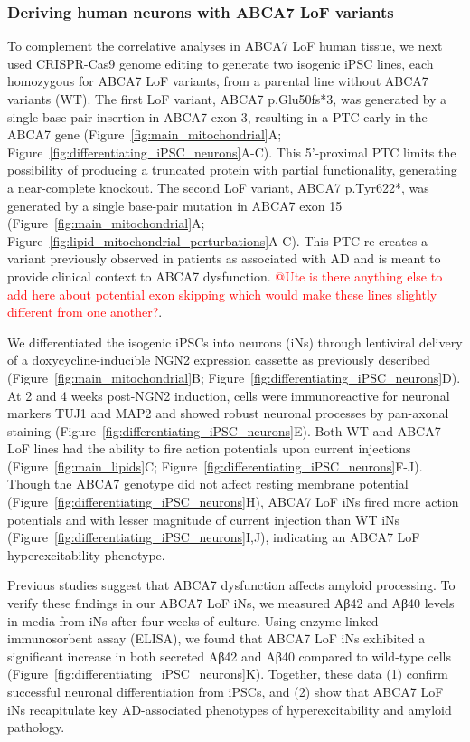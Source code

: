 \subsubsection{Deriving human neurons with ABCA7 LoF variants}
To complement the correlative analyses in ABCA7 LoF human tissue, we next used CRISPR-Cas9 genome editing to generate two isogenic iPSC lines, each homozygous for ABCA7 LoF variants, from a parental line without ABCA7 variants (WT). The first LoF variant, ABCA7 p.Glu50fs*3, was generated by a single base-pair insertion in ABCA7 exon 3, resulting in a PTC early in the ABCA7 gene (Figure~\ref{fig:main_mitochondrial}A; Figure~\ref{fig:differentiating_iPSC_neurons}A-C). This 5'-proximal PTC limits the possibility of producing a truncated protein with partial functionality, generating a near-complete knockout. The second LoF variant, ABCA7 p.Tyr622*, was generated by a single base-pair mutation in ABCA7 exon 15 (Figure~\ref{fig:main_mitochondrial}A; Figure~\ref{fig:lipid_mitochondrial_perturbations}A-C). This PTC re-creates a variant previously observed in patients as associated with AD \cite{Steinberg2015-mu} and is meant to provide clinical context to ABCA7 dysfunction. \textcolor{red}{@Ute is there anything else to add here about potential exon skipping which would make these lines slightly different from one another?}.

We differentiated the isogenic iPSCs into neurons (iNs) through lentiviral delivery of a doxycycline-inducible NGN2 expression cassette as previously described\cite{Ho2016-kz} (Figure~\ref{fig:main_mitochondrial}B; Figure~\ref{fig:differentiating_iPSC_neurons}D). At 2 and 4 weeks post-NGN2 induction, cells were immunoreactive for neuronal markers TUJ1 and MAP2 and showed robust neuronal processes by pan-axonal staining (Figure~\ref{fig:differentiating_iPSC_neurons}E). Both WT and ABCA7 LoF lines had the ability to fire action potentials upon current injections (Figure~\ref{fig:main_lipids}C; Figure~\ref{fig:differentiating_iPSC_neurons}F-J). Though the ABCA7 genotype did not affect resting membrane potential (Figure~\ref{fig:differentiating_iPSC_neurons}H), ABCA7 LoF iNs fired more action potentials and with lesser magnitude of current injection than WT iNs (Figure~\ref{fig:differentiating_iPSC_neurons}I,J), indicating an ABCA7 LoF hyperexcitability phenotype. 

Previous studies suggest that ABCA7 dysfunction affects amyloid processing\cite{Satoh2015-yu,Sakae2016-uy,Bamji-Mirza2018-xt,Chan2008-qu,De_Roeck2018-zx}. To verify these findings in our ABCA7 LoF iNs, we measured Aβ42 and Aβ40 levels in media from iNs after four weeks of culture. Using enzyme-linked immunosorbent assay (ELISA), we found that ABCA7 LoF iNs exhibited a significant increase in both secreted Aβ42 and Aβ40 compared to wild-type cells (Figure~\ref{fig:differentiating_iPSC_neurons}K). Together, these data (1) confirm successful neuronal differentiation from iPSCs, and (2) show that ABCA7 LoF iNs recapitulate key AD-associated phenotypes of hyperexcitability and amyloid pathology.

